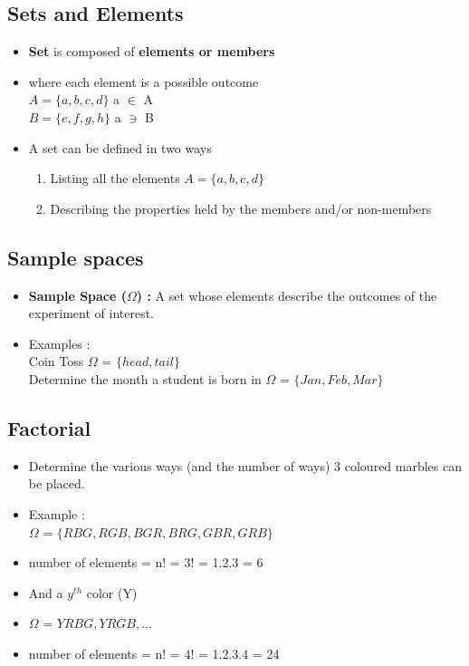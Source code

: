 \documentclass[13pt]{book}
\begin{document}
\subsection{Sets and Elements}
\begin{itemize}
\item \textbf{Set} is composed of \textbf{elements or members}
\item where each element is a possible outcome \\
  \( A = \{a,b,c,d\}\) a \(\in\) A\\
  \( B = \{e,f,g,h\}\) a \(\ni\) B
\item A set can be defined in two ways
  \begin{enumerate}
  \item Listing all the elements \( A = \{a,b,c,d\}\)
  \item Describing the properties held by the members and/or non-members
    \end{enumerate}
\end{itemize}
\subsection{Sample spaces}
\begin{itemize}
\item \textbf{Sample Space (\(\Omega\)) : } A set whose elements describe the outcomes of the experiment of interest.
\item Examples : \\ Coin Toss \(\Omega\) = \( \{ head,tail \}\)\\
  Determine the month a student is born in \(\Omega\) = \( \{Jan,Feb,Mar\}\)
\end{itemize}
\subsection{Factorial}
\begin{itemize}
\item Determine the various ways (and the number of ways) 3 coloured marbles can be placed.
\item Example : \\
  \(\Omega\) = \(\{RBG,RGB,BGR,BRG,GBR,GRB\}\)
\item number of elements = n! = 3! = 1.2.3 = 6
\item And a \(y^{th}\) color (Y)
\item\(\Omega\) = \({YRBG,YRGB,...}\)
\item number of elements = n! = 4! = 1.2.3.4 = 24
\end{itemize}
\end{document}
